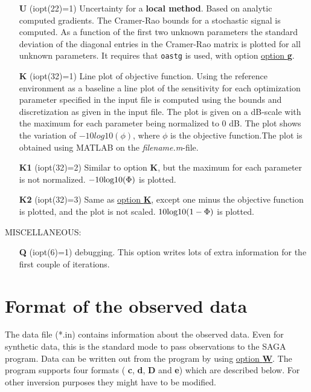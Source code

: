 \documentclass{saclantc}
\begin{document}
\begin{itemize}
\vspace{-0.3cm} \item[{\bf U}] (iopt(22)=1) Uncertainty for a {\bf
    local method}. 
 Based on analytic computed gradients. The Cramer-Rao bounds for a
   stochastic signal  is computed. As a function of the first two
   unknown parameters the standard deviation of the diagonal entries in
   the Cramer-Rao matrix is plotted for all unknown parameters. It
   requires that {\tt oastg} is used, with option \underline{option {\bf g}}.
\vspace{-0.3cm} \item[{\bf K}] (iopt(32)=1) Line plot of objective function. 
Using the reference environment as a baseline  a line plot of the
sensitivity for each optimization parameter specified in the input
file  is computed using the bounds and discretization as given in the
input file. The plot is given on a dB-scale with the maximum for each
parameter being normalized to 0 dB. The plot shows the variation of
$-10 log10 (\phi)$, where $\phi$ is the objective function.The plot is obtained using MATLAB on the {\it filename.m}-file. 
\vspace{-0.3cm} \item[{\bf K1}] (iopt(32)=2) Similar to option {\bf K}, but 
the maximum for each parameter is not normalized. $-10 { \rm log10} (\Phi)$ is plotted.
 \vspace{-0.3cm}    \item[{\bf K2}] (iopt(32)=3) 
Same as \underline{option {\bf K}}, except one minus the objective function
 is plotted, and the plot is not scaled. $10 { \rm log10} (1-\Phi)$ is plotted.
\end{itemize}

\noindent MISCELLANEOUS:

\vspace{-0.6cm}
\begin{itemize}
    \item[{\bf Q}] (iopt(6)=1) debugging. This  option writes  lots of extra 
information for the first couple of iterations. 
\end{itemize}



\newpage


\section{Format of the observed data}
\label{se:data}

The data file (*.in) contains information about the observed
data. Even for synthetic data, this is the standard mode to pass
observations to the {\sf SAGA} program.  Data can be written out from the
program by using \underline{option {\bf W}}.  The program supports four formats ({\bf
c}, {\bf d}, {\bf D} and {\bf e}) which are described below.  For
other inversion purposes they might have to be modified.
\end{document}
